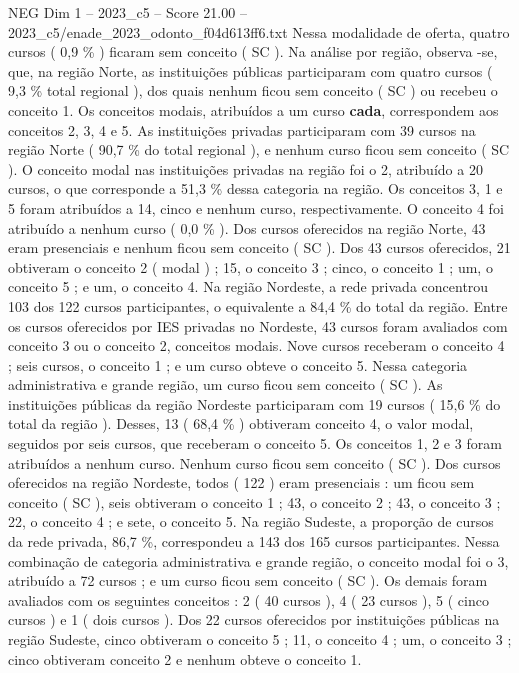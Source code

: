 \begin{textsample}{NEG Dim 1 – 2023\_c5 – Score 21.00 – 2023\_c5/enade\_2023\_odonto\_f04d613ff6.txt}
Nessa modalidade de oferta, quatro cursos ( 0,9 \% ) ficaram sem conceito ( SC ).
Na análise por região, observa -se, que, na região Norte, as instituições públicas participaram com quatro cursos ( 9,3 \% total regional ), dos quais nenhum ficou sem conceito ( SC ) ou recebeu o conceito 1.
Os conceitos modais, atribuídos a um curso \textbf{cada}, correspondem aos conceitos 2, 3, 4 e 5.
As instituições privadas participaram com 39 cursos na região Norte ( 90,7 \% do total regional ), e nenhum curso ficou sem conceito ( SC ).
O conceito modal nas instituições privadas na região foi o 2, atribuído a 20 cursos, o que corresponde a 51,3 \% dessa categoria na região.
Os conceitos 3, 1 e 5 foram atribuídos a 14, cinco e nenhum curso, respectivamente.
O conceito 4 foi atribuído a nenhum curso ( 0,0 \% ).
Dos cursos oferecidos na região Norte, 43 eram presenciais e nenhum ficou sem conceito ( SC ).
Dos 43 cursos oferecidos, 21 obtiveram o conceito 2 ( modal ) ; 15, o conceito 3 ; cinco, o conceito 1 ; um, o conceito 5 ; e um, o conceito 4.
Na região Nordeste, a rede privada concentrou 103 dos 122 cursos participantes, o equivalente a 84,4 \% do total da região.
Entre os cursos oferecidos por IES privadas no Nordeste, 43 cursos foram avaliados com conceito 3 ou o conceito 2, conceitos modais.
Nove cursos receberam o conceito 4 ; seis cursos, o conceito 1 ; e um curso obteve o conceito 5.
Nessa categoria administrativa e grande região, um curso ficou sem conceito ( SC ).
As instituições públicas da região Nordeste participaram com 19 cursos ( 15,6 \% do total da região ).
Desses, 13 ( 68,4 \% ) obtiveram conceito 4, o valor modal, seguidos por seis cursos, que receberam o conceito 5.
Os conceitos 1, 2 e 3 foram atribuídos a nenhum curso.
Nenhum curso ficou sem conceito ( SC ).
Dos cursos oferecidos na região Nordeste, todos ( 122 ) eram presenciais : um ficou sem conceito ( SC ), seis obtiveram o conceito 1 ; 43, o conceito 2 ; 43, o conceito 3 ; 22, o conceito 4 ; e sete, o conceito 5.
Na região Sudeste, a proporção de cursos da rede privada, 86,7 \%, correspondeu a 143 dos 165 cursos participantes.
Nessa combinação de categoria administrativa e grande região, o conceito modal foi o 3, atribuído a 72 cursos ; e um curso ficou sem conceito ( SC ).
Os demais foram avaliados com os seguintes conceitos : 2 ( 40 cursos ), 4 ( 23 cursos ), 5 ( cinco cursos ) e 1 ( dois cursos ).
Dos 22 cursos oferecidos por instituições públicas na região Sudeste, cinco obtiveram o conceito 5 ; 11, o conceito 4 ; um, o conceito 3 ; cinco obtiveram conceito 2 e nenhum obteve o conceito 1.

\end{textsample}
